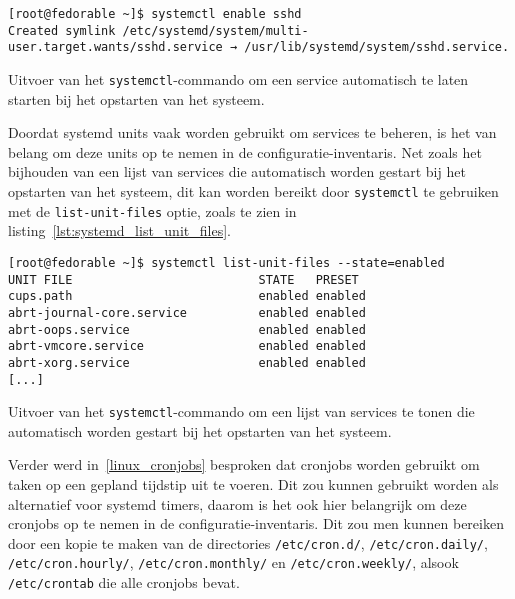 \begin{listing}
  \begin{verbatim}
[root@fedorable ~]$ systemctl enable sshd
Created symlink /etc/systemd/system/multi-user.target.wants/sshd.service → /usr/lib/systemd/system/sshd.service.
  \end{verbatim}
  \caption[Automatische service start met systemctl.]{Uitvoer van het \texttt{systemctl}-commando om een service automatisch te laten starten bij het opstarten van het systeem.}
  \label{lst:systemd_enable}
\end{listing}

Doordat systemd units vaak worden gebruikt om services te beheren, is het van belang om deze units op te nemen in de configuratie-inventaris.
Net zoals het bijhouden van een lijst van services die automatisch worden gestart bij het opstarten van het systeem, dit kan worden bereikt door \texttt{systemctl} te gebruiken met de \texttt{list-unit-files} optie, zoals te zien in listing~\ref{lst:systemd_list_unit_files}.

\begin{listing}
  \begin{verbatim}
[root@fedorable ~]$ systemctl list-unit-files --state=enabled
UNIT FILE                          STATE   PRESET
cups.path                          enabled enabled
abrt-journal-core.service          enabled enabled
abrt-oops.service                  enabled enabled
abrt-vmcore.service                enabled enabled
abrt-xorg.service                  enabled enabled
[...]
  \end{verbatim}
  \caption[Lijst van automatisch gestarte services.]{Uitvoer van het \texttt{systemctl}-commando om een lijst van services te tonen die automatisch worden gestart bij het opstarten van het systeem.}
  \label{lst:systemd_list_unit_files}
\end{listing}

Verder werd in~\ref{linux_cronjobs} besproken dat cronjobs worden gebruikt om taken op een gepland tijdstip uit te voeren.
Dit zou kunnen gebruikt worden als alternatief voor systemd timers, daarom is het ook hier belangrijk om deze cronjobs op te nemen in de configuratie-inventaris.
Dit zou men kunnen bereiken door een kopie te maken van de directories \texttt{/etc/cron.d/}, \texttt{/etc/cron.daily/}, \texttt{/etc/cron.hourly/}, \texttt{/etc/cron.monthly/} en \texttt{/etc/cron.weekly/}, alsook \texttt{/etc/crontab} die alle cronjobs bevat.

